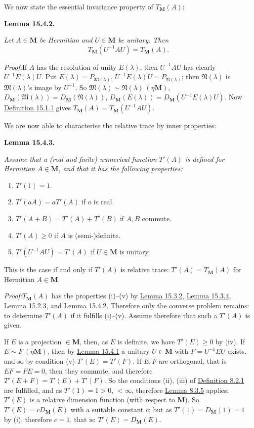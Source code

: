 \documentclass[12pt,b5paper,twoside]{article}
\newcommand{\M}{\mathbf M}
\newcommand{\Lemma}[1]{%
  \par\smallskip\noindent\phantomsection\label{lem:#1}\textbf{Lemma #1.}\enspace
}
\newcommand{\Proof}{\par\noindent\textit{Proof:}\enspace}
\newcommand{\defref}[1]{\hyperref[def:#1]{Definition #1}}
\newcommand{\lemref}[1]{\hyperref[lem:#1]{Lemma #1}}
\begin{document}
We now state the essential invariance property of \(T_{\M}(A)\):

\Lemma{15.4.2}
{\itshape Let \(A\in\M\) be Hermitian and \(U\in\M\) be unitary. Then
\[
T_{\M}(U^{-1}AU)=T_{\M}(A).
\]}

\Proof If \(A\) has the resolution of unity \(E(\lambda)\), then
\(U^{-1}AU\) has clearly \(U^{-1}E(\lambda)U\). Put
\(E(\lambda)=P_{\mathfrak M(\lambda)}\),
\(U^{-1}E(\lambda)U=P_{\mathfrak N(\lambda)}\); then
\(\mathfrak N(\lambda)\) is \(\mathfrak M(\lambda)\)'s image by
\(U^{-1}\). So
\(\mathfrak M(\lambda)\sim\mathfrak N(\lambda)\ (\mathbin\eta\M)\),
\(D_{\M}(\mathfrak M(\lambda))=D_{\M}(\mathfrak N(\lambda))\),
\(D_{\M}(E(\lambda))=D_{\M}(U^{-1}E(\lambda)U)\). Now
\defref{15.1.1} gives \(T_{\M}(A)=T_{\M}(U^{-1}AU)\).

We are now able to characterise the relative trace by inner properties:

\Lemma{15.4.3}
{\itshape Assume that a (real and finite) numerical function \(T'(A)\) is
defined for Hermitian \(A\in\M\), and that it has the following properties:
\begin{enumerate}[label=(\roman*)]
\item \(T'(1)=1\).
\item \(T'(aA)=aT'(A)\) if \(a\) is real.
\item \(T'(A+B)=T'(A)+T'(B)\) if \(A,B\) commute.
\item \(T'(A)\geq0\) if \(A\) is (semi-)definite.
\item \(T'(U^{-1}AU)=T'(A)\) if \(U\in\M\) is unitary.
\end{enumerate}
This is the case if and only if \(T'(A)\) is relative trace:
\(T'(A)=T_{\M}(A)\) for Hermitian \(A\in\M\).}

\Proof \(T_{\M}(A)\) has the properties (i)--(v) by \lemref{15.3.2},
\lemref{15.3.4}, \lemref{15.2.3}, and \lemref{15.4.2}. Therefore only the
converse problem remains: to determine \(T'(A)\) if it fulfills (i)--(v).
Assume therefore that such a \(T'(A)\) is given.

If \(E\) is a projection \(\in\M\), then, as \(E\) is definite, we have
\(T'(E)\geq0\) by (iv). If \(E\sim F\ (\mathbin\eta\M)\), then by
\lemref{15.4.1} a unitary \(U\in\M\) with \(F=U^{-1}EU\) exists, and so
by condition (v) \(T'(E)=T'(F)\). If \(E,F\) are orthogonal, that is
\(EF=FE=0\), then they commute, and therefore
\(T'(E+F)=T'(E)+T'(F)\). So the conditions (ii), (iii) of
\defref{8.2.1} are fulfilled, and as \(T'(1)=1>0\), \(<\infty\), therefore
\lemref{8.3.5} applies: \(T'(E)\) is a relative dimension function (with
respect to \(\M\)). So \(T'(E)=cD_{\M}(E)\) with a suitable constant \(c\);
but as \(T'(1)=D_{\M}(1)=1\) by (i), therefore \(c=1\), that is:
\(T'(E)=D_{\M}(E)\).
\end{document}
